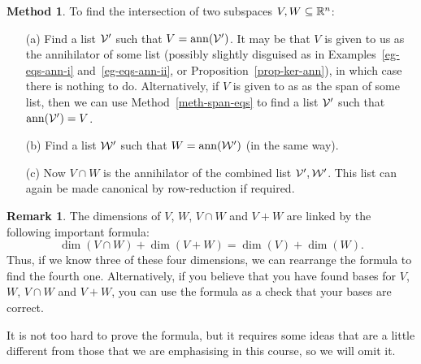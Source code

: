 \documentclass[reqno]{amsart}
\theoremstyle{definition}
\newtheorem{remark}[theorem]{Remark}
\newtheorem{method}[theorem]{Method}
\begin{document}
\begin{method}\label{meth-find-meet}
 To find the intersection of two subspaces $V,W\subseteq{\mathbb{R}}^n$:
 \begin{itemize}
  \item[(a)] Find a list $\mathcal{V}'$ such that $V=\operatorname{ann}(\mathcal{V}')$.  It may be
   that $V$ is given to us as the annihilator of some list (possibly
   slightly disguised as in Examples~\ref{eg-eqs-ann-i}
   and~\ref{eg-eqs-ann-ii}, or Proposition~\ref{prop-ker-ann}), in
   which case there is nothing to do.  Alternatively, if $V$ is given
   to as as the span of some list, then we can use
   Method~\ref{meth-span-eqs} to find a list $\mathcal{V}'$ such that
   $\operatorname{ann}(\mathcal{V}')=V$. 
  \item[(b)] Find a list $\mathcal{W}'$ such that $W=\operatorname{ann}(\mathcal{W}')$ (in the same
   way).
  \item[(c)] Now $V\cap W$ is the annihilator of the combined list
   $\mathcal{V}',\mathcal{W}'$.  This list can again be made canonical by row-reduction
   if required.
 \end{itemize}
\end{method}

\begin{remark}\label{rem-dim-formula}
 The dimensions of $V$, $W$, $V\cap W$ and $V+W$ are linked by the
 following important formula:
 \[ \dim(V\cap W) + \dim(V+W) = \dim(V) + \dim(W). \]
 Thus, if we know three of these four dimensions, we can rearrange the
 formula to find the fourth one.  Alternatively, if you believe that
 you have found bases for $V$, $W$, $V\cap W$ and $V+W$, you can use
 the formula as a check that your bases are correct.

 It is not too hard to prove the formula, but it requires some ideas
 that are a little different from those that we are emphasising in
 this course, so we will omit it.
\end{remark}
\end{document}
